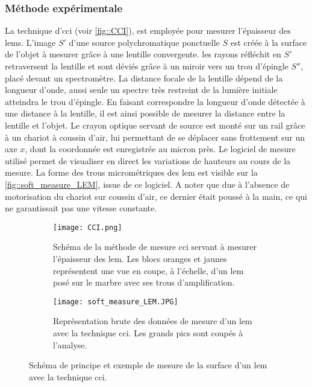         \subsubsection{Méthode expérimentale}
          La technique d'\acrfull{cci} (voir \autoref{fig::CCI}), est employée pour mesurer l'épaisseur des \glspl{lem}. L'image $S'$ d'une source polychromatique ponctuelle $S$ est créée à la surface de l'objet à mesurer grâce à une lentille convergente. les rayons réfléchit en $S'$ retraversent la lentille et sont déviés grâce à un miroir vers un trou d'épingle $S''$, placé devant un spectromètre. La distance focale de la lentille dépend de la longueur d'onde, aussi seule un spectre très restreint de la lumière initiale atteindra le trou d'épingle. En faisant correspondre la longueur d'onde détectée à une distance à la lentille, il est ainsi possible de mesurer la distance entre la lentille et l'objet. Le crayon optique servant de source est monté sur un rail grâce à un chariot à coussin d'air, lui permettant de se déplacer sans frottement sur un axe $x$, dont la coordonnée est enregistrée au micron près. Le logiciel de mesure utilisé permet de visualiser en direct les variations de hauteurs au cours de la mesure. La forme des trous micrométriques des \gls{lem} est visible sur la \autoref{fig::soft_measure_LEM}, issue de ce logiciel. A noter que due à l'absence de motorisation du chariot sur coussin d'air, ce dernier était poussé à la main, ce qui ne garantissait pas une vitesse constante.
          
          \begin{figure}[htpb]
            \begin{subfigure}{0.48\textwidth}
              \texttt{[image: CCI.png]}
              \caption{\label{fig::CCI}Schéma de la méthode de mesure \gls{cci} servant à mesurer l'épaisseur des \gls{lem}. Les blocs oranges et jaunes représentent une vue en coupe, à l'échelle, d'un \gls{lem} posé sur le marbre avec ses trous d'amplification.}
            \end{subfigure}
            \hfill
            \begin{subfigure}{0.48\textwidth}
              \texttt{[image: soft\_measure\_LEM.JPG]}
              \caption{\label{fig::soft_measure_LEM}Représentation brute des données de mesure d'un \gls{lem} avec la technique \gls{cci}. Les grands pics sont coupés à l'analyse.}
            \end{subfigure}
            \caption[Schéma de principe et exemple de mesure de la surface d'un LEM avec la technique CCI.]{Schéma de principe et exemple de mesure de la surface d'un \gls{lem} avec la technique \gls{cci}.}
          \end{figure}
          
